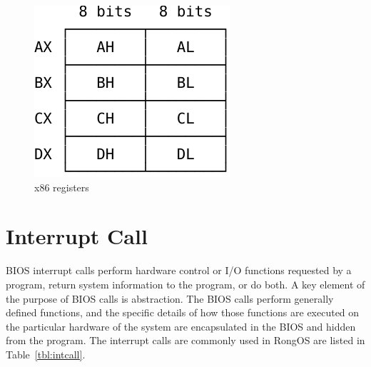 \documentclass{swfcthesis}
\begin{document}
\begin{figure}[!htbp]
  \centering
  \begin{center}
    \includegraphics[width=.4\textwidth]{registers}
  \end{center}
  \caption{x86 registers}
  \label{fig:regs}
\end{figure}

\section{Interrupt Call}

BIOS interrupt calls perform hardware control or I/O functions requested by a program,
return system information to the program, or do both. A key element of the purpose of BIOS
calls is abstraction. The BIOS calls perform generally defined functions, and the specific
details of how those functions are executed on the particular hardware of the system are
encapsulated in the BIOS and hidden from the program\cite{wiki:bios-int}. The interrupt
calls are commonly used in RongOS are listed in Table~\ref{tbl:intcall}.
\end{document}
